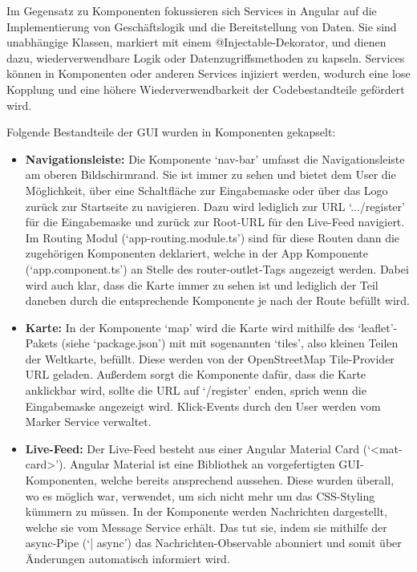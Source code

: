 \documentclass[../main.tex]{subfiles} %
\begin{document}
Im Gegensatz zu Komponenten fokussieren sich Services in Angular auf die Implementierung von Geschäftslogik und die Bereitstellung von Daten. 
Sie sind unabhängige Klassen, markiert mit einem @Injectable-Dekorator, und dienen dazu, wiederverwendbare Logik oder Datenzugriffsmethoden zu 
kapseln. Services können in Komponenten oder anderen Services injiziert werden, wodurch eine lose Kopplung und eine höhere Wiederverwendbarkeit 
der Codebestandteile gefördert wird.

Folgende Bestandteile der GUI wurden in Komponenten gekapselt:

\begin{itemize}

	\item \textbf{Navigationsleiste:}
	      Die Komponente `nav-bar' umfasst die Navigationsleiste am oberen Bildschirmrand. Sie ist immer zu sehen und bietet dem User die Möglichkeit,
        über eine Schaltfläche zur Eingabemaske oder über das Logo zurück zur Startseite zu navigieren. Dazu wird lediglich zur URL `.../register' für die 
        Eingabemaske und zurück zur Root-URL für den Live-Feed navigiert. Im Routing Modul (`app-routing.module.ts') sind für diese Routen dann die
        zugehörigen Komponenten deklariert, welche in der App Komponente (`app.component.ts') an Stelle des router-outlet-Tags angezeigt werden.
        Dabei wird auch klar, dass die Karte immer zu sehen ist und lediglich der Teil daneben durch die entsprechende Komponente je nach der Route 
        befüllt wird. 

  \item \textbf{Karte:}
        In der Komponente `map' wird die Karte wird mithilfe des `leaflet'-Pakets (siehe `package.json') mit mit sogenannten `tiles', also kleinen 
        Teilen der Weltkarte, befüllt. Diese werden von der OpenStreetMap Tile-Provider URL geladen. Außerdem sorgt die Komponente dafür, dass die Karte 
        anklickbar wird, sollte die URL auf `/register' enden, sprich wenn die Eingabemaske angezeigt wird. Klick-Events durch den User werden vom Marker 
        Service verwaltet.

  \item \textbf{Live-Feed:}
        Der Live-Feed besteht aus einer Angular Material Card (`<mat-card>'). Angular Material ist eine Bibliothek an vorgefertigten GUI-Komponenten,
        welche bereits ansprechend aussehen. Diese wurden überall, wo es möglich war, verwendet, um sich nicht mehr um das CSS-Styling kümmern zu müssen.
        In der Komponente werden Nachrichten dargestellt, welche sie vom Message Service erhält. Das tut sie, indem sie mithilfe der async-Pipe (`| async') 
        das Nachrichten-Observable abonniert und somit über Änderungen automatisch informiert wird. 


\end{itemize}
\end{document}
